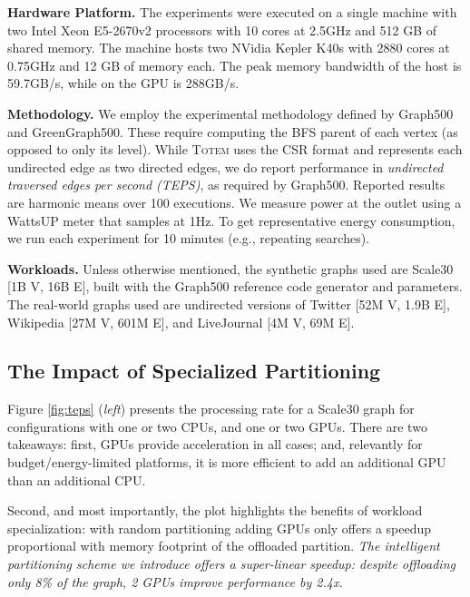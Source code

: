 \documentclass{llncs}
\begin{document}
\noindent\textbf{Hardware Platform.} The experiments were executed on a single machine with two Intel Xeon E5-2670v2 processors with 10 cores at 2.5GHz and 512 GB of shared memory. The machine hosts two NVidia Kepler K40s with 2880 cores at 0.75GHz and 12 GB of memory each. The peak memory bandwidth of the host is 59.7GB/s, while on the GPU is 288GB/s.

\noindent\textbf{Methodology.} We employ the experimental methodology defined by Graph500 and GreenGraph500. These require computing the BFS parent of each vertex (as opposed to only its level). While \textsc{Totem} uses the CSR format and represents each undirected edge as two directed edges, we do report performance in \textit{undirected traversed edges per second (TEPS)}, as required by Graph500. Reported results are harmonic means over 100 executions. We measure power at the outlet using a WattsUP meter that samples at 1Hz. To get representative energy consumption, we run each experiment for 10 minutes (e.g., repeating searches).

\noindent\textbf{Workloads.} Unless otherwise mentioned, the synthetic graphs used are Scale30 [1B V, 16B E], built with the Graph500 reference code generator and parameters. The real-world graphs used are undirected versions of Twitter \cite{cha2010measuring} [52M V, 1.9B E], Wikipedia \cite{KONECT} [27M V, 601M E], and LiveJournal \cite{snapnets} [4M V, 69M E].
\subsection{The Impact of Specialized Partitioning}\label{sec:hardwareconf}Figure \ref{fig:teps} (\textit{left}) presents the processing rate for a Scale30 graph for configurations with one or two CPUs, and one or two GPUs. There are two takeaways: first, GPUs provide acceleration in all cases; and, relevantly for budget/energy-limited platforms, it is more efficient to add an additional GPU than an additional CPU. 

Second, and most importantly, the plot highlights the benefits of workload specialization: with random partitioning adding GPUs only offers a speedup proportional with memory footprint of the offloaded partition. \textit{The intelligent partitioning scheme we introduce offers a super-linear speedup: despite offloading only 8\% of the graph, 2 GPUs improve performance by 2.4x.}
\end{document}
